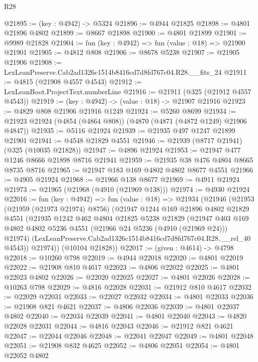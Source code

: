 \begin{lexlean}{R28}
\begin{coremodule}
@21895 := (key : @4942) -> @5324
@21896 := @4944 @21825
@21898 := @4801 @21896 @4802
@21899 := @8667 @21898
@21900 := @4801 @21899
@21901 := @9989 @21828
@21904 := fun (key : @4942) => fun (value : @18) => @21900 @21901
@21905 := @4812 @808
@21906 := @8678 @5238
@21907 := @21905 @21906
@21908 := LexLeanPreserve.Cab2ad1326c1514b8416cd7d8fd767c04.R28.__fits_24
@21911 := @4815 (@21908 @4557 @4543)
@21912 := LexLeanBoot.ProjectText.numberLine
@21916 := @21911 (@325 (@21912 @4557 @4543))
@21919 := (key : @4942) -> (value : @18) -> @21907 @21916
@21923 := @4829 @808 @21906 @21916 @1249
@21924 := @5260 @8699
@21934 := @21923 @21924 (@4854 (@4864 @808)) (@4870 (@4871 (@4872 @1249) @21906 @4847))
@21935 := @5116 @21924
@21939 := @21935 @497 @1247 @21899 @21901
@21941 := @4548 @21829 @4551
@21946 := @21939 (@8717 @21941) (@325 (@10035 @21828))
@21947 := @4896 @21924
@21953 := @21947 @477 @1246 @8666 @21898 @8716 @21941
@21959 := @21935 @38 @476 @4804 @8665 @8735 @8716
@21965 := @21947 @183 @169 @4802 @4802 @8677 @4551
@21966 := @4905 @21924
@21968 := @21966 @138 @8677
@21969 := @4911 @21924
@21973 := @21965 (@21968 (@4910 (@21969 @138)))
@21974 := @4930 @21924
@22016 := fun (key : @4942) =>
  fun (value : @18) =>
  @21934
    (@21946
      (@21953
        (@21959 (@21973 @21974) @8756)
        (@21947
          @1244
          @169
          @21896
          @4802
          @21829
          @4551
          (@21935
            @1242
            @462
            @4804
            @21825
            @5238
            @21829
            (@21947
              @403
              @169
              @4802
              @4802
              @5236
              @4551
              (@21966 @24 @5236 (@4910 (@21969 @24)))
              @21974)
            (LexLeanPreserve.Cab2ad1326c1514b8416cd7d8fd767c04.R28.__rel_40 @4543))
          @21974))
      (@10104 @21828))
@22017 := (given : @4614) -> @4798
@22018 := @10260 @798
@22019 := @4944 @22018
@22020 := @4801 @22019
@22022 := @21908 @810 @4617
@22023 := @4806 @22022
@22025 := @4801 @22023 @4802
@22026 := @22020 @22025
@22027 := @4801 @22026
@22028 := @10263 @798
@22029 := @4816 @22028
@22031 := @21912 @810 @4617
@22032 := @22029 @22031
@22033 := @22027 @22032
@22034 := @4801 @22033
@22036 := @21908 @821 @4621
@22037 := @4806 @22036
@22039 := @4801 @22037 @4802
@22040 := @22034 @22039
@22041 := @4801 @22040
@22043 := @4820 @22028 @22031
@22044 := @4816 @22043
@22046 := @21912 @821 @4621
@22047 := @22044 @22046
@22048 := @22041 @22047
@22049 := @4801 @22048
@22051 := @21908 @832 @4625
@22052 := @4806 @22051
@22054 := @4801 @22052 @4802

\end{coremodule}
\end{lexlean}
